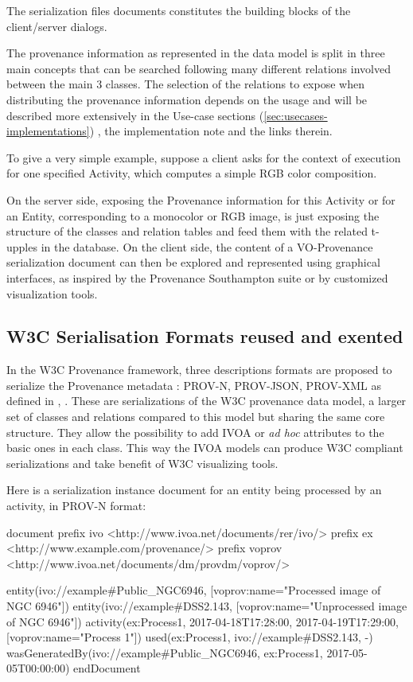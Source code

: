 The serialization files documents constitutes the building blocks of the client/server dialogs.

The provenance information as represented in the data model is split in three main concepts that can be searched following many different relations involved between the main 3 classes. 
The selection of the relations to expose when distributing the provenance information depends on the usage and will be described more extensively in the Use-case sections (\ref{sec:usecases-implementations}) , the implementation note \citep[]{std:ProvenanceImplementationNote} and the links therein.

To give a very simple example, suppose a client asks for the context of execution for one specified Activity, which computes a simple RGB color composition. 

On the server side, exposing the Provenance information for this Activity or for an Entity, corresponding to a monocolor or RGB image, is just exposing the structure of the classes and relation tables and feed them with the related t-upples in the database.
On the client side, the content of a VO-Provenance serialization document can then be explored and represented using graphical interfaces, as inspired by the Provenance Southampton suite or by customized visualization tools.
 
\subsection{W3C Serialisation Formats reused and exented}
In the W3C Provenance framework, three descriptions formats are proposed to serialize the Provenance metadata : {PROV-N}, {PROV-JSON}, {PROV-XML} as defined in \citep[]{std:W3CProvN}, \citep[]{soton356855}. These are serializations of the W3C provenance data model, a larger set of classes and relations compared to this model but sharing the same core structure. They allow the possibility to add IVOA or \textit{ad hoc} attributes to the basic ones in each class. This way the IVOA models can produce W3C compliant serializations and take benefit of W3C visualizing tools.

Here is a serialization instance document for an entity being processed by an activity, in PROV-N format:

\begin{verbnobox}[\scriptsize]

document
  prefix ivo <http://www.ivoa.net/documents/rer/ivo/>
  prefix ex <http://www.example.com/provenance/>
  prefix voprov <http://www.ivoa.net/documents/dm/provdm/voprov/>

  entity(ivo://example#Public_NGC6946, [voprov:name="Processed image of NGC 6946"])
  entity(ivo://example#DSS2.143, [voprov:name="Unprocessed image of NGC 6946"])
  activity(ex:Process1, 2017-04-18T17:28:00, 2017-04-19T17:29:00, [voprov:name="Process 1"])
  used(ex:Process1, ivo://example#DSS2.143, -)
  wasGeneratedBy(ivo://example#Public_NGC6946, ex:Process1, 2017-05-05T00:00:00)
endDocument

\end{verbnobox}

